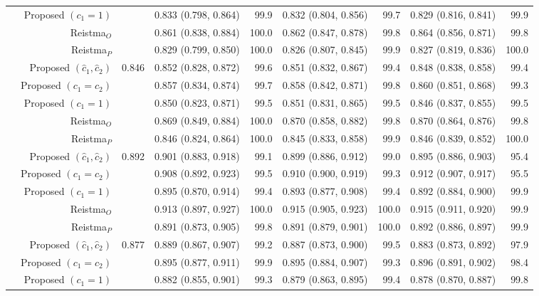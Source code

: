 \begin{table}
\begin{threeparttable}
\begin{tabular}[t]{rrrrrrrrr}
 & Proposed $(c_1 = 1)$ &  & 0.833 (0.798, 0.864) & 99.9 & 0.832 (0.804, 0.856) & 99.7 & 0.829 (0.816, 0.841) & 99.9\\
 & Reistma$_O$ &  & 0.861 (0.838, 0.884) & 100.0 & 0.862 (0.847, 0.878) & 99.8 & 0.864 (0.856, 0.871) & 99.8\\
 & Reistma$_P$ &  & 0.829 (0.799, 0.850) & 100.0 & 0.826 (0.807, 0.845) & 99.9 & 0.827 (0.819, 0.836) & 100.0\\
\addlinespace
4 & Proposed $(\hat{c}_1, \hat{c}_2)$ & 0.846 & 0.852 (0.828, 0.872) & 99.6 & 0.851 (0.832, 0.867) & 99.4 & 0.848 (0.838, 0.858) & 99.4\\
 & Proposed $(c_1 = c_2)$ &  & 0.857 (0.834, 0.874) & 99.7 & 0.858 (0.842, 0.871) & 99.8 & 0.860 (0.851, 0.868) & 99.3\\
 & Proposed $(c_1 = 1)$ &  & 0.850 (0.823, 0.871) & 99.5 & 0.851 (0.831, 0.865) & 99.5 & 0.846 (0.837, 0.855) & 99.5\\
 & Reistma$_O$ &  & 0.869 (0.849, 0.884) & 100.0 & 0.870 (0.858, 0.882) & 99.8 & 0.870 (0.864, 0.876) & 99.8\\
 & Reistma$_P$ &  & 0.846 (0.824, 0.864) & 100.0 & 0.845 (0.833, 0.858) & 99.9 & 0.846 (0.839, 0.852) & 100.0\\
\addlinespace
5 & Proposed $(\hat{c}_1, \hat{c}_2)$ & 0.892 & 0.901 (0.883, 0.918) & 99.1 & 0.899 (0.886, 0.912) & 99.0 & 0.895 (0.886, 0.903) & 95.4\\
 & Proposed $(c_1 = c_2)$ &  & 0.908 (0.892, 0.923) & 99.5 & 0.910 (0.900, 0.919) & 99.3 & 0.912 (0.907, 0.917) & 95.5\\
 & Proposed $(c_1 = 1)$ &  & 0.895 (0.870, 0.914) & 99.4 & 0.893 (0.877, 0.908) & 99.4 & 0.892 (0.884, 0.900) & 99.9\\
 & Reistma$_O$ &  & 0.913 (0.897, 0.927) & 100.0 & 0.915 (0.905, 0.923) & 100.0 & 0.915 (0.911, 0.920) & 99.9\\
 & Reistma$_P$ &  & 0.891 (0.873, 0.905) & 99.8 & 0.891 (0.879, 0.901) & 100.0 & 0.892 (0.886, 0.897) & 99.9\\
\addlinespace
6 & Proposed $(\hat{c}_1, \hat{c}_2)$ & 0.877 & 0.889 (0.867, 0.907) & 99.2 & 0.887 (0.873, 0.900) & 99.5 & 0.883 (0.873, 0.892) & 97.9\\
 & Proposed $(c_1 = c_2)$ &  & 0.895 (0.877, 0.911) & 99.9 & 0.895 (0.884, 0.907) & 99.3 & 0.896 (0.891, 0.902) & 98.4\\
 & Proposed $(c_1 = 1)$ &  & 0.882 (0.855, 0.901) & 99.3 & 0.879 (0.863, 0.895) & 99.4 & 0.878 (0.870, 0.887) & 99.8\\

\end{tabular}
\end{threeparttable}
\end{table}
